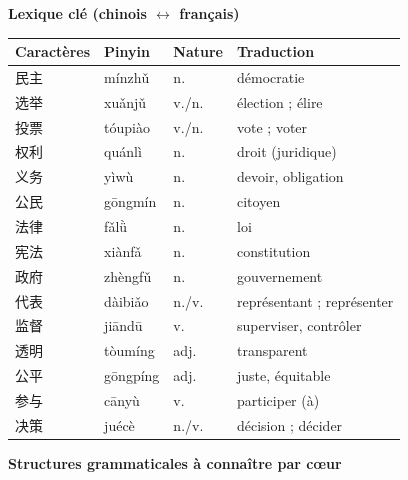 \documentclass[11pt]{article}
\begin{document}
\begin{bilan}

\textbf{Lexique clé (chinois $\leftrightarrow$ français)}

\begin{center}
\begin{tabularx}{\linewidth}{|X|X|X|X|}
\hline
\rowcolor{popblueL} \textbf{Caractères} & \textbf{Pinyin} & \textbf{Nature} & \textbf{Traduction} \\ \hline
民主 & mínzhǔ & n. & démocratie \\ \hline
选举 & xuǎnjǔ & v./n. & élection ; élire \\ \hline
投票 & tóupiào & v./n. & vote ; voter \\ \hline
权利 & quánlì & n. & droit (juridique) \\ \hline
义务 & yìwù & n. & devoir, obligation \\ \hline
公民 & gōngmín & n. & citoyen \\ \hline
法律 & fǎlǜ & n. & loi \\ \hline
宪法 & xiànfǎ & n. & constitution \\ \hline
政府 & zhèngfǔ & n. & gouvernement \\ \hline
代表 & dàibiǎo & n./v. & représentant ; représenter \\ \hline
监督 & jiāndū & v. & superviser, contrôler \\ \hline
透明 & tòumíng & adj. & transparent \\ \hline
公平 & gōngpíng & adj. & juste, équitable \\ \hline
参与 & cānyù & v. & participer (à) \\ \hline
决策 & juécè & n./v. & décision ; décider \\ \hline
\end{tabularx}
\end{center}

\textbf{Structures grammaticales à connaître par cœur}


\end{bilan}
\end{document}
